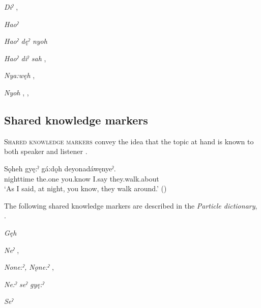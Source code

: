 \begin{CayugaRelated}
\item{}\textit{Diˀ} , \\
\item{}\textit{Haoˀ} \\
\item{}\textit{Haoˀ dęˀ nyoh} \\
\item{}\textit{Haoˀ diˀ sah} , \\
\item{}\textit{Nya:węh} , \\
\item{}\textit{Nyoh} , , \\
\end{CayugaRelated}



\subsection{Shared knowledge markers} \label{ch:Shared knowledge markers}
\textsc{Shared knowledge markers} convey the idea that the topic at hand is known to both speaker and listener . 

\ea\label{ex:sharedknowledge}
 \gll Sǫheh gyę:ˀ  gá:dǫh deyonadáwęnyeˀ.\\
nighttime the.one you.know I.say they.walk.about\\
\glt ‘As I said, at night, you know, they walk around.’ (\cite{mithun_how_1980})
\z

The following shared knowledge markers are described in the \textit{Particle dictionary}, .

\begin{CayugaRelated}
\item{}\textit{Gęh} \\
\item{}\textit{Neˀ} , \\
\item{}\textit{None:ˀ, Nǫne:ˀ} , \\
\item{}\textit{Ne:ˀ seˀ gyę:ˀ} \\
\item{}\textit{Seˀ} 
\end{CayugaRelated}


